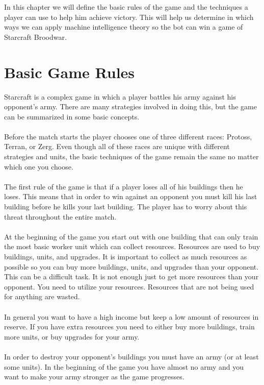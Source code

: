 In this chapter we will define the basic rules of the game and the techniques a player can use to help him achieve victory.
This will help us determine in which ways we can apply machine intelligence theory so the bot can win a game of Starcraft Broodwar. 

\section{Basic Game Rules}
	Starcraft is a complex game in which a player battles his army against his opponent's army. 
	There are many strategies involved in doing this, but the game can be summarized in some basic concepts.
\\
\\
	Before the match starts the player chooses one of three different races: Protoss, Terran, or Zerg. 
	Even though all of these races are unique with different strategies and units, 
	the basic techniques of the game remain the same no matter which one you choose.
\\
\\	
	The first rule of the game is that if a player loses all of his buildings then he loses. 
	This means that in order to win against an opponent you must kill his last building before he kills your last building. The player has to worry about this threat throughout the entire match.
\\
\\	
	At the beginning of the game you start out with one building that can only train the most basic worker unit which can collect resources. 
	Resources are used to buy buildings, units, and upgrades. 
	It is important to collect  as much resources as possible so you can buy more buildings, units, and upgrades than your opponent.
	This can be a difficult task. It is not enough just to get more resources than your opponent. 
	You need to utilize your resources. Resources that are not being used for anything are wasted.
\\
\\ 
	In general you want to have a high income but keep a low amount of resources in reserve. 
	If you have extra resources you need to either buy more buildings, train more units, or buy upgrades for your army.\\
\\
	In order to destroy your opponent's buildings you must have an army (or at least some units). 
	In the beginning of the game you have almost no army and you want to make your army stronger as the game progresses. 
